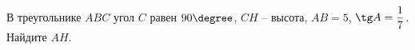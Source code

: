 \begin{ex}
	\begin{condition}
		В треугольнике \( ABC \) угол \( C \) равен \( 90 \degree \), \( CH \) – высота, \( AB=5 \),  \( \tg A=\dfrac{1}{7} \). Найдите \( AH \).
	\end{condition}
\end{ex}